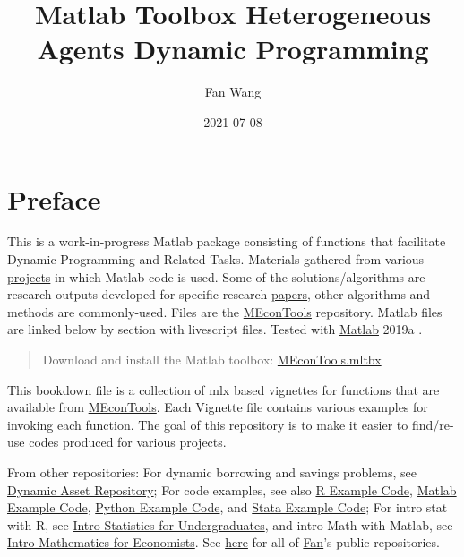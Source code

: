 \documentclass[
]{book}
\title{Matlab Toolbox Heterogeneous Agents Dynamic Programming}
\author{Fan Wang}
\date{2021-07-08}
\begin{document}
\maketitle

{
\hypersetup{linkcolor=}
\setcounter{tocdepth}{1}
\tableofcontents
}
\hypertarget{preface}{%
\chapter*{Preface}\label{preface}}

This is a work-in-progress Matlab package consisting of functions that facilitate Dynamic Programming and Related Tasks. Materials gathered from various \href{https://fanwangecon.github.io/research}{projects} in which Matlab code is used. Some of the solutions/algorithms are research outputs developed for specific research \href{https://fanwangecon.github.io/research}{papers}, other algorithms and methods are commonly-used. Files are the \href{https://github.com/FanWangEcon/MEconTools}{MEconTools} repository. Matlab files are linked below by section with livescript files. Tested with \href{https://www.mathworks.com/products/matlab.html}{Matlab} 2019a \citep{matlab}.

\begin{quote}
Download and install the Matlab toolbox: \href{https://github.com/FanWangEcon/MEconTools/blob/master/MEconTools.mltbx}{MEconTools.mltbx}
\end{quote}

This bookdown file is a collection of mlx based vignettes for functions that are available from \href{https://github.com/FanWangEcon/MEconTools}{MEconTools}. Each Vignette file contains various examples for invoking each function. The goal of this repository is to make it easier to find/re-use codes produced for various projects.

From other repositories: For dynamic borrowing and savings problems, see \href{https://fanwangecon.github.io/CodeDynaAsset/}{Dynamic Asset Repository}; For code examples, see also \href{https://fanwangecon.github.io/R4Econ/}{R Example Code}, \href{https://fanwangecon.github.io/M4Econ/}{Matlab Example Code}, \href{https://fanwangecon.github.io/Py4Econ/}{Python Example Code}, and \href{https://fanwangecon.github.io/Stata4Econ/}{Stata Example Code}; For intro stat with R, see \href{https://fanwangecon.github.io/Stat4Econ/}{Intro Statistics for Undergraduates}, and intro Math with Matlab, see \href{https://fanwangecon.github.io/Math4Econ/}{Intro Mathematics for Economists}. See \href{https://github.com/FanWangEcon}{here} for all of \href{https://fanwangecon.github.io/}{Fan}'s public repositories.
\end{document}
